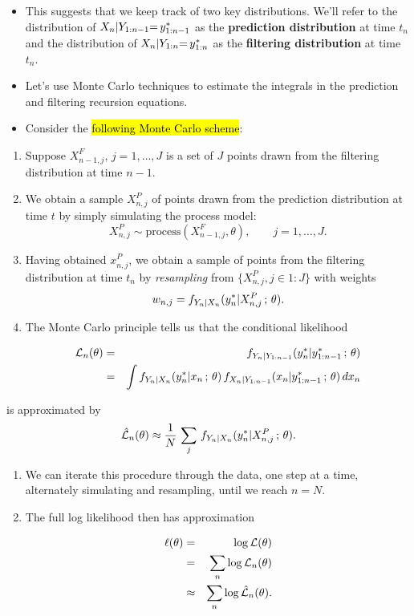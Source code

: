 \documentclass[]{article}
\begin{document}
\begin{itemize}
\item
  This suggests that we keep track of two key distributions. We'll refer
  to the distribution of \(X_n | Y_{1:n-1}{=\,} y^*_{1:n-1}\) as the
  \textbf{prediction distribution} at time \(t_n\) and the distribution
  of \(X_{n} | Y_{1:n}{=\,} y^*_{1:n}\) as the \textbf{filtering
  distribution} at time \(t_n\).
\item
  Let's use Monte Carlo techniques to estimate the integrals in the
  prediction and filtering recursion equations.
\item
  Consider the \hl{following Monte Carlo scheme}:
\end{itemize}

\begin{enumerate}
\def\labelenumi{\arabic{enumi}.}
\item
  Suppose \(X_{n-1,j}^{F}\), \(j=1,\dots,J\) is a set of \(J\) points
  drawn from the filtering distribution at time \(n-1\).
\item
  We obtain a sample \(X_{n,j}^{P}\) of points drawn from the prediction
  distribution at time \(t\) by simply simulating the process model:
  \[X_{n,j}^{P} \sim \mathrm{process}(X_{n-1,j}^{F},\theta), \qquad j=1,\dots,J.\]
\item
  Having obtained \(x_{n,j}^{P}\), we obtain a sample of points from the
  filtering distribution at time \(t_n\) by \emph{resampling} from
  \(\big\{X_{n,j}^{P},j\in 1:J\big\}\) with weights
  \[w_{n,j}=f_{Y_n|X_n}(y^*_{n}|X^P_{n,j}\, ; \,\theta).\]
\item
  The Monte Carlo principle tells us that the conditional likelihood

  \begin{eqnarray}
  \mathcal{L}_n(\theta) &=& f_{Y_n|Y_{1:n-1}}(y^*_n|y^*_{1:n-1}\, ; \,\theta)
  \\
  &=& 
  \int
  f_{Y_n|X_n}(y^*_{n}|x_{n}\, ; \,\theta)\,f_{X_n|Y_{1:n-1}}(x_{n}|y^*_{1:n-1}\, ; \,\theta)\, dx_n
  \end{eqnarray}
\end{enumerate}

is approximated by
\[\hat{\mathcal{L}}_n(\theta)  \approx \frac{1}{N}\,\sum_j\, f_{Y_n|X_n}(y^*_{n}|X_{n,j}^{P}\, ; \,\theta).\]

\begin{enumerate}
\def\labelenumi{\arabic{enumi}.}
\setcounter{enumi}{4}
\item
  We can iterate this procedure through the data, one step at a time,
  alternately simulating and resampling, until we reach \(n=N\).
\item
  The full log likelihood then has approximation

  \begin{eqnarray}\ell(\theta) 
  &=& \log{\mathcal{L}(\theta)} 
  \\
  &=& \sum_n \log{\mathcal{L}_n(\theta)}
  \\
  &\approx& \sum_n\log\hat{\mathcal{L}}_n(\theta).
  \end{eqnarray}
\end{enumerate}
\end{document}
